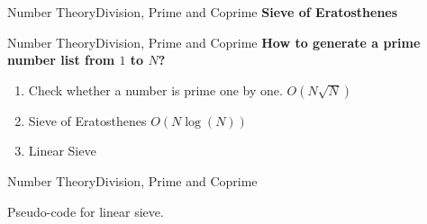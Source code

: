 \documentclass[10pt]{beamer}
\begin{document}
\begin{frame}{Number Theory}{Division, Prime and Coprime}
\textbf{\large Sieve of Eratosthenes } \\
\begin{center}
\end{center}
\end{frame}


\begin{frame}{Number Theory}{Division, Prime and Coprime}
\textbf{\large How to generate a prime number list from $1$ to $N$?}
\begin{enumerate}
	\item Check whether a number is prime one by one. $O(N\sqrt{N})$
	\item Sieve of Eratosthenes \pause $O(N\log(N))$ \pause
	\item Linear Sieve
\end{enumerate}
\end{frame}


\begin{frame}{Number Theory}{Division, Prime and Coprime}
\begin{algorithm}[H]
\begin{algorithmic}[1]
	\ENDFOR
		\ENDIF
			\ENDIF
		\ENDWHILE
	\ENDFOR
\end{algorithmic}
\caption*{Pseudo-code for linear sieve.}
\end{algorithm}
\end{frame}
\end{document}
